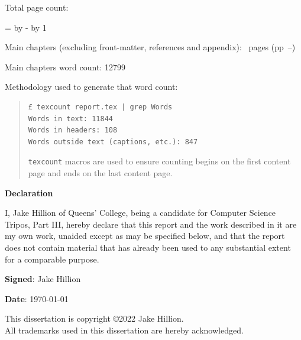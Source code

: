 \documentclass[12pt,a4paper,twoside]{report}
\newif\ifsubmission %
\begin{document}
\begin{sffamily}
\newpage

Total page count: \pageref{lastpage}

\makeatletter
\@tempcnta=\relax%
\advance\@tempcnta by -%
\advance\@tempcnta by 1%
\xdef\contentpages{\the\@tempcnta}%
\makeatother

Main chapters (excluding front-matter, references and appendix):
\contentpages~pages
(pp~\pageref{firstcontentpage}--\pageref{lastcontentpage})

Main chapters word count: 12799

Methodology used to generate that word count:

\begin{quote}
\begin{verbatim}
£ texcount report.tex | grep Words
Words in text: 11844
Words in headers: 108
Words outside text (captions, etc.): 847
\end{verbatim}

\texttt{texcount} macros are used to ensure counting begins on the first content page and ends on the last content page.
\end{quote}

\end{sffamily}

\onehalfspacing

\ifsubmission\else

\newpage
{\Huge \bf Declaration}

\vspace{24pt}

I, Jake Hillion of Queens' College, being a candidate for Computer
Science Tripos, Part III, hereby declare that this report and the
work described in it are my own work, unaided except as may be
specified below, and that the report does not contain material that
has already been used to any substantial extent for a comparable
purpose.

\vspace{60pt}
\textbf{Signed}:  Jake Hillion

\vspace{12pt}
\textbf{Date}: \today


\vfill

This dissertation is copyright \copyright 2022 Jake Hillion. 
\\
All trademarks used in this dissertation are hereby acknowledged.
\end{document}
